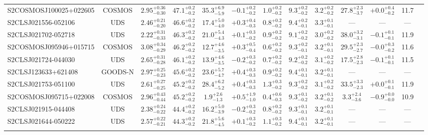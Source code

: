 \documentclass[a4paper, fleqn, usenatbib]{mnras}
\begin{document}
\begin{landscape}
\begin{table}
\begin{tabular}{l c c c c c c c c c c c c}
        S2COSMOSJ100025+022605 & COSMOS & $2.95^{+0.36}_{-0.30}$ & $47.1^{+0.2}_{-0.2}$ & $35.3^{+6.9}_{-5.9}$ & $-0.1^{+0.2}_{-0.2}$ & $1.0^{+0.2}_{-0.2}$ & $9.3^{+0.2}_{-0.2}$ & $3.2^{+0.2}_{-0.2}$ & $27.8^{+2.3}_{-3.7}$ & $+0.0^{+0.4}_{-0.2}$ & 11.7\\
        S2CLSJ021556-052106 & UDS & $2.46^{+0.21}_{-0.20}$ & $46.6^{+0.2}_{-0.2}$ & $17.4^{+5.0}_{-4.0}$ & $+0.3^{+0.4}_{-0.3}$ & $0.8^{+0.2}_{-0.2}$ & $9.4^{+0.2}_{-0.1}$ & $3.3^{+0.1}_{-0.1}$ & --- & --- & ---\\
        S2CLSJ021702-052718 & UDS & $2.22^{+0.31}_{-0.33}$ & $46.3^{+0.2}_{-0.2}$ & $21.0^{+5.4}_{-4.3}$ & $+0.1^{+0.3}_{-0.2}$ & $0.9^{+0.2}_{-0.2}$ & $9.1^{+0.2}_{-0.2}$ & $3.0^{+0.2}_{-0.2}$ & $38.0^{+3.2}_{-3.1}$ & $-0.1^{+0.1}_{-0.1}$ & 11.9\\
        S2COSMOSJ095946+015715 & COSMOS & $3.08^{+0.34}_{-0.29}$ & $46.2^{+0.2}_{-0.2}$ & $12.7^{+4.6}_{-3.5}$ & $+0.3^{+0.5}_{-0.4}$ & $0.6^{+0.2}_{-0.2}$ & $9.3^{+0.2}_{-0.1}$ & $3.2^{+0.1}_{-0.1}$ & $29.5^{+2.3}_{-2.7}$ & $-0.0^{+0.3}_{-0.2}$ & 11.6\\
        S2CLSJ021724-044030 & UDS & $2.65^{+0.31}_{-0.28}$ & $46.1^{+0.2}_{-0.2}$ & $13.9^{+4.6}_{-3.5}$ & $-0.2^{+0.3}_{-0.2}$ & $0.7^{+0.2}_{-0.2}$ & $9.2^{+0.2}_{-0.2}$ & $3.1^{+0.2}_{-0.2}$ & $17.5^{+2.8}_{-2.3}$ & $-0.1^{+0.1}_{-0.1}$ & 11.5\\
        S2CLSJ123633+621408 & GOODS-N & $2.97^{+0.25}_{-0.23}$ & $45.6^{+0.2}_{-0.2}$ & $23.6^{+5.7}_{-4.7}$ & $+0.4^{+0.3}_{-0.3}$ & $0.9^{+0.2}_{-0.2}$ & $9.4^{+0.1}_{-0.1}$ & $3.2^{+0.1}_{-0.1}$ & --- & --- & ---\\
        S2CLSJ021753-051100 & UDS & $2.61^{+0.27}_{-0.25}$ & $45.2^{+0.2}_{-0.2}$ & $28.4^{+6.2}_{-5.2}$ & $+0.4^{+0.3}_{-0.3}$ & $1.3^{+0.3}_{-0.2}$ & $9.3^{+0.2}_{-0.2}$ & $3.1^{+0.2}_{-0.2}$ & $33.5^{+3.3}_{-2.3}$ & $+0.0^{+0.1}_{-0.1}$ & 11.9\\
        S2COSMOSJ095715+022008 & COSMOS & $2.96^{+0.43}_{-0.44}$ & $45.2^{+0.2}_{-0.2}$ & $1.9^{+2.6}_{-1.3}$ & $+0.5^{+1.9}_{-1.0}$ & $0.4^{+0.6}_{-0.3}$ & $9.3^{+0.1}_{-0.2}$ & $3.2^{+0.1}_{-0.2}$ & $3.3^{+2.4}_{-3.6}$ & $-0.9^{+0.0}_{-0.0}$ & 10.9\\
        S2CLSJ021915-044408 & UDS & $2.38^{+0.24}_{-0.22}$ & $44.4^{+0.2}_{-0.2}$ & $16.2^{+5.0}_{-3.9}$ & $-0.2^{+0.3}_{-0.2}$ & $0.8^{+0.2}_{-0.2}$ & $9.3^{+0.1}_{-0.1}$ & $3.2^{+0.1}_{-0.1}$ & --- & --- & ---\\
        S2CLSJ021644-050222 & UDS & $2.57^{+0.22}_{-0.21}$ & $44.3^{+0.2}_{-0.2}$ & $21.8^{+5.6}_{-4.5}$ & $+0.1^{+0.3}_{-0.2}$ & $1.1^{+0.3}_{-0.2}$ & $9.4^{+0.1}_{-0.1}$ & $3.2^{+0.1}_{-0.1}$ & --- & --- & ---\\
        \hline\\
    \end{tabular}
\end{table}
\end{landscape}
\end{document}
